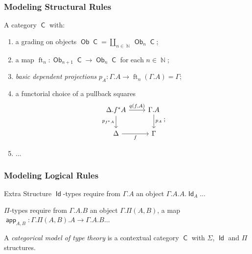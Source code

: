 \documentclass{beamer}
\DeclareMathOperator{\Id}{\mathsf{Id}}
\DeclareMathOperator{\sfC}{\mathsf{C}}
\DeclareMathOperator{\N}{\mathbb{N}}
\DeclareMathOperator{\Ob}{\mathsf{Ob}}
\DeclareMathOperator{\ft}{ft}
\DeclareMathOperator{\app}{\mathsf{app}}
\begin{document}
\begin{frame}
  \frametitle{Modeling Structural Rules}

  \begin{definition}
    A category $\sfC$ with:
    \begin{enumerate}
      \item a grading on objects $\Ob\sfC=\coprod_{n\in\N}\Ob_n\sfC$;
      \item a map $\ft_n\colon\Ob_{n+1}\sfC\rightarrow\Ob_n\sfC$ for each
        $n\in\N$;
      \item \emph{basic dependent projections}
        $p_A\colon\Gamma.A\rightarrow\ft_n(\Gamma.A)=\Gamma$;
      \item a functorial choice of a pullback squares
        \[\begin{tikzcd}[ampersand replacement=\&]
          {\Delta.f^*A} \& {\Gamma.A} \\
          \Delta \& \Gamma
          \arrow["{p_A}", from=1-2, to=2-2]
          \arrow["{p_{f^*A}}"', from=1-1, to=2-1]
          \arrow["{q(f,A)}", from=1-1, to=1-2]
          \arrow["f"', from=2-1, to=2-2]
        \end{tikzcd};\]
      \item ...
    \end{enumerate}
  \end{definition}
\end{frame}

\begin{frame}
  \frametitle{Modeling Logical Rules}

  \begin{block}{Extra Structure}
    $\Id$-types require from $\Gamma.A$ an object $\Gamma.A.A.\Id_A$...
    
    $\Pi$-types require from $\Gamma.A.B$ an object $\Gamma.\Pi(A,B)$, a map
    $\app_{A,B}\colon\Gamma.\Pi(A,B).A\rightarrow\Gamma.A.B$...
  \end{block}

  \begin{defn}
    A \emph{categorical model of type theory} is a contextual category $\sfC$
    with $\Sigma$, $\Id$ and $\Pi$ structures.
  \end{defn}
\end{frame}
\end{document}
